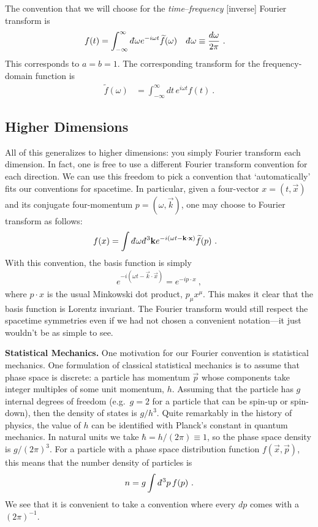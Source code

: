 The convention that we will choose for the \emph{time}--\emph{frequency} [inverse] Fourier transform is
\begin{align}
	f(t) &= \int_{-\infty}^{\infty} \dbar\omega e^{-i\omega t} \tilde f(\omega)
	&
	\dbar \omega &\equiv\frac{d\omega}{2\pi} \ .
\end{align}
This corresponds to $a=b=1$. The corresponding transform for the frequency-domain function is
\begin{align}
	\tilde f(\omega) &= 
	\int_{-\infty}^\infty d t\, e^{i\omega t} f(t) \ .
	\label{eq:inverse:fourier:convention}
\end{align}


\subsection{Higher Dimensions}

All of this generalizes to higher dimensions: you simply Fourier transform each dimension. In fact, one is free to use a different Fourier transform convention for each direction. We can use this freedom to pick a convention that `automatically' fits our conventions for spacetime. In particular, given a four-vector $x=(t,\vec{x})$ and its conjugate four-momentum $p=(\omega, \vec{k})$, one may choose to Fourier transform as follows: 
\begin{align}
	f(x) &= \int \dbar\omega\dbar^3\vec{k} e^{-i(\omega t-\vec{k}\cdot\vec{x})} \tilde f(p)
	\ .
\end{align}
With this convention, the basis function is simply
\begin{align}
	e^{-i(\omega t-\vec{k}\cdot\vec{x})} 
	= e^{-ip\cdot x} \ , 
\end{align}
where $p\cdot x$ is the usual Minkowski dot product, $p_\mu x^\mu$. This makes it clear that the basis function is Lorentz invariant. The Fourier transform would still respect the spacetime symmetries even if we had not chosen a convenient notation---it just wouldn't be as simple to see.

\begin{example}
\textbf{Statistical Mechanics.} One motivation for our Fourier convention is statistical mechanics. One formulation of classical statistical mechanics is to assume that phase space is discrete: a particle has momentum $\vec{p}$ whose components take integer multiples of some unit momentum, $h$. Assuming that the particle has $g$ internal degrees of freedom (e.g.~$g=2$ for a particle that can be spin-up or spin-down), then the density of states is $g/h^{3}$. Quite remarkably in the history of physics, the value of $h$ can be identified with Planck's constant in quantum mechanics. In natural units we take $\hbar = h/(2\pi)\equiv 1$, so the phase space density is $g/(2\pi)^3$. For a particle with a phase space distribution function $f(\vec{x},\vec{p})$, this means that the number density of particles is
\begin{align}
	n = g\int \dbar^3p \, f(p) \ .
\end{align}
We see that it is convenient to take a convention where every $dp$ comes with a $(2\pi)^{-1}$.
\end{example}


